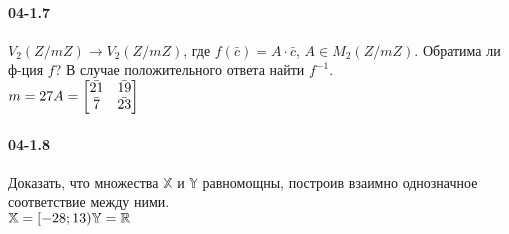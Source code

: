 \documentclass[12pt]{article}
\begin{document}
	\clearpage
	\paragraph{04-1.7} $V_{2}(Z/mZ) \longrightarrow V_{2}(Z/mZ)$, где $f(\bar{c}) = A \cdot \bar{c}$, $A \in M_{2}(Z/mZ)$. Обратима ли ф-ция $f$? В случае положительного ответа найти $f^{-1}$.
	\\
	\ensuremath{
		m = 27 \\ \\
		A = \begin{bmatrix}
			\bar{21} & \bar{19} \\
			\bar{7} & \bar{23}
		\end{bmatrix}
	}
	\clearpage
	\paragraph{04-1.8} Доказать, что множества $\mathbb{X}$ и $\mathbb{Y}$ равномощны, построив взаимно однозначное соответствие между ними.
	\\
	\ensuremath{
		\mathbb{X} = [ -28 ; 13 ) \\
		\mathbb{Y} = \mathbb{R}
	}
	\clearpage
\end{document}
